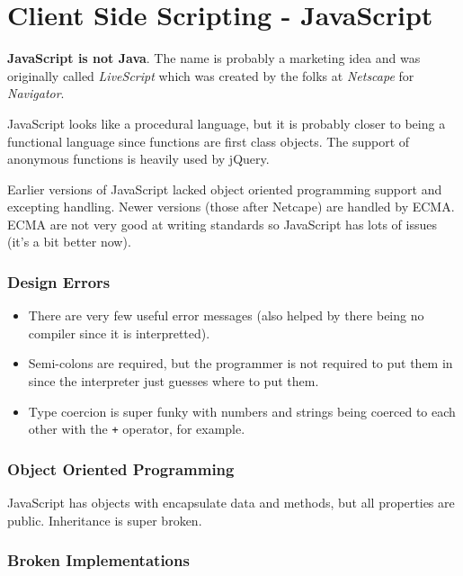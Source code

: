 \section{Client Side Scripting - JavaScript}\label{sec:client_side_scripting}

\textbf{JavaScript is not Java}.
The name is probably a marketing idea and was originally called \emph{LiveScript} which was created by the folks at \emph{Netscape} for \emph{Navigator}.

JavaScript looks like a procedural language, but it is probably closer to being a functional language since functions are first class objects.
The support of anonymous functions is heavily used by jQuery.

Earlier versions of JavaScript lacked object oriented programming support and excepting handling.
Newer versions (those after Netcape) are handled by ECMA.
ECMA are not very good at writing standards so JavaScript has lots of issues (it's a bit better now).

\subsubsection{Design Errors}\label{ssub:design_errors}

\begin{itemize}
	\item There are very few useful error messages (also helped by there being no compiler since it is interpretted).
	\item Semi-colons are required, but the programmer is not required to put them in since the interpreter just guesses where to put them.
	\item Type coercion is super funky with numbers and strings being coerced to each other with the \texttt{+} operator, for example.
\end{itemize}

\subsubsection{Object Oriented Programming}\label{ssub:object_oriented_programming}

JavaScript has objects with encapsulate data and methods, but all properties are public.
Inheritance is super broken.

\subsubsection{Broken Implementations}\label{ssub:broken_implementations}

